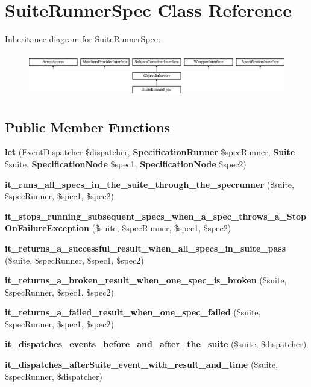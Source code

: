 \section{Suite\+Runner\+Spec Class Reference}
\label{classspec_1_1_php_spec_1_1_runner_1_1_suite_runner_spec}
Inheritance diagram for Suite\+Runner\+Spec\+:\begin{figure}[H]
\begin{center}
\leavevmode
\includegraphics[height=1.953488cm]{classspec_1_1_php_spec_1_1_runner_1_1_suite_runner_spec}
\end{center}
\end{figure}
\subsection*{Public Member Functions}
\begin{DoxyCompactItemize}
\item 
{\bf let} (Event\+Dispatcher \$dispatcher, {\bf Specification\+Runner} \$spec\+Runner, {\bf Suite} \$suite, {\bf Specification\+Node} \$spec1, {\bf Specification\+Node} \$spec2)
\item 
{\bf it\+\_\+runs\+\_\+all\+\_\+specs\+\_\+in\+\_\+the\+\_\+suite\+\_\+through\+\_\+the\+\_\+specrunner} (\$suite, \$spec\+Runner, \$spec1, \$spec2)
\item 
{\bf it\+\_\+stops\+\_\+running\+\_\+subsequent\+\_\+specs\+\_\+when\+\_\+a\+\_\+spec\+\_\+throws\+\_\+a\+\_\+\+Stop\+On\+Failure\+Exception} (\$suite, \$spec\+Runner, \$spec1, \$spec2)
\item 
{\bf it\+\_\+returns\+\_\+a\+\_\+successful\+\_\+result\+\_\+when\+\_\+all\+\_\+specs\+\_\+in\+\_\+suite\+\_\+pass} (\$suite, \$spec\+Runner, \$spec1, \$spec2)
\item 
{\bf it\+\_\+returns\+\_\+a\+\_\+broken\+\_\+result\+\_\+when\+\_\+one\+\_\+spec\+\_\+is\+\_\+broken} (\$suite, \$spec\+Runner, \$spec1, \$spec2)
\item 
{\bf it\+\_\+returns\+\_\+a\+\_\+failed\+\_\+result\+\_\+when\+\_\+one\+\_\+spec\+\_\+failed} (\$suite, \$spec\+Runner, \$spec1, \$spec2)
\item 
{\bf it\+\_\+dispatches\+\_\+events\+\_\+before\+\_\+and\+\_\+after\+\_\+the\+\_\+suite} (\$suite, \$dispatcher)
\item 
{\bf it\+\_\+dispatches\+\_\+after\+Suite\+\_\+event\+\_\+with\+\_\+result\+\_\+and\+\_\+time} (\$suite, \$spec\+Runner, \$dispatcher)
\end{DoxyCompactItemize}

